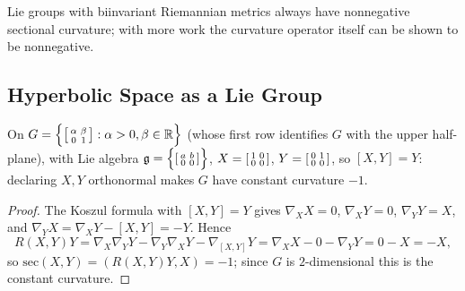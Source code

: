 \begin{remark}
  \label{rem:pet-ch4-biinvariant-nonneg-curvature}
  Lie groups with biinvariant Riemannian metrics always have nonnegative
  sectional curvature; with more work the curvature operator itself can be
  shown to be nonnegative.
\end{remark}

\subsection{Hyperbolic Space as a Lie Group}

\begin{example}
  \label{ex:pet-ch4-hyperbolic-lie-group}
  On $G=\Big\{\begin{bsmallmatrix}\alpha&\beta\\0&1\end{bsmallmatrix}:\alpha>0,\beta\in\mathbb{R}\Big\}$
  (whose first row identifies $G$ with the upper half-plane), with Lie algebra
  $\mathfrak g=\Big\{\begin{bsmallmatrix}a&b\\0&0\end{bsmallmatrix}\Big\}$,
  $X=\begin{bsmallmatrix}1&0\\0&0\end{bsmallmatrix}$,
  $Y=\begin{bsmallmatrix}0&1\\0&0\end{bsmallmatrix}$, so $[X,Y]=Y$: declaring
  $X,Y$ orthonormal makes $G$ have constant curvature $-1$.
\end{example}
\begin{proof}
  The Koszul formula with $[X,Y]=Y$ gives $\nabla_XX=0$, $\nabla_XY=0$,
  $\nabla_YY=X$, and $\nabla_YX=\nabla_XY-[X,Y]=-Y$. Hence
  \[
    R(X,Y)Y=\nabla_X\nabla_YY-\nabla_Y\nabla_XY-\nabla_{[X,Y]}Y
    =\nabla_XX-0-\nabla_YY=0-X=-X,
  \]
  so $\mathrm{sec}(X,Y)=(R(X,Y)Y,X)=-1$; since $G$ is $2$-dimensional this is
  the constant curvature.
\end{proof}

